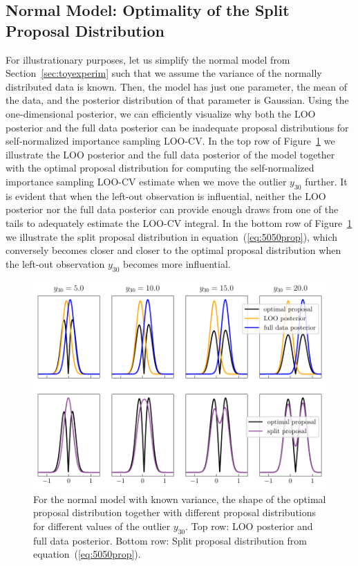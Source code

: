 \documentclass[12pt]{article}
\begin{document}
\begin{appendices}
\subsection{Normal Model: Optimality of the Split Proposal Distribution} \label{sec:optimality}


For illustrationary purposes, let us simplify the normal model from Section~\ref{sec:toyexperim} such that we assume the variance
of the normally distributed data is known. Then, the model has just one parameter, the mean
of the data, and the posterior distribution
of that parameter is Gaussian.
Using the one-dimensional posterior, we can efficiently visualize
why both the LOO posterior and the full data posterior can
be inadequate proposal distributions for self-normalized importance sampling LOO-CV.
In the top row of Figure~\ref{fig:optimal_vs_smm_3} we illustrate
the LOO posterior and the full data posterior of the model together with
the optimal proposal distribution for computing the self-normalized
importance sampling LOO-CV estimate when we move the outlier $y_{30}$ further. It is evident that
when the left-out observation is influential,
neither the LOO posterior nor the full data posterior can
provide enough draws from one of the tails to adequately estimate the LOO-CV integral.
In the bottom row of Figure~\ref{fig:optimal_vs_smm_3} we illustrate the split proposal distribution in equation~(\ref{eq:5050prop}), which
conversely becomes closer and closer to the optimal proposal distribution
when the left-out observation $y_{30}$ becomes more influential.






\begin{figure}[t]
\centering
\includegraphics[]{figs/normalmodel_optimal_prop.pdf}
\caption{For the normal model with known variance, the shape of
the optimal proposal distribution together with different proposal distributions
for different values of the outlier $y_{30}$.
Top row: LOO posterior and full data posterior.
Bottom row: Split proposal distribution from equation~(\ref{eq:5050prop}).} \label{fig:optimal_vs_smm_3}
\end{figure}






\end{appendices}
\end{document}
